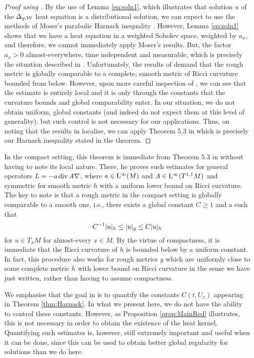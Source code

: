 \documentclass[a4paper, 12pt]{amsart}
\begin{document}
\begin{proof}[Proof using \cite{SC}]
By the use of Lemma \ref{eq:soln1}, which illustrates that solution $u$ of the $\Delta_{g,\mathcal{W}}$ heat equation is a distributional solution, we can expect to use the methods of Moser's parabolic Harnack inequality \cite{MR0159139,MR0288405}. However, Lemma \ref{eq:soln1} shows that we have a heat equation in a weighted Sobolev space, weighted by $a_x$, and therefore, we cannot immediately apply Moser's results. But, the factor $a_x > 0$ almost-everywhere, time independent and measurable, which is precisely the situation described in \cite[Section 4]{SC}.  Unfortunately, the results of \cite{SC} demand that the rough metric is globally comparable to a complete, smooth metric of Ricci curvature bounded from below. However, upon more careful inspection of \cite{SC}, we can see that the estimate is entirely local and it is only through the constants that the curvature bounds and global comparability enter. In our situation, we do not obtain uniform, global constants (and indeed do not expect them at this level of generality), but such control is not necessary for our applications. Thus, on noting that the results in \cite{SC} localise, we can apply Theorem 5.3 in \cite{SC} which is precisely our Harnack inequality stated in the theorem.
\end{proof}

In the compact setting, this theorem 
is immediate from Theorem 5.3 in \cite{SC} without having to note
its local nature. There, 
he proves such estimates for general operators
$L = -a \operatorname{div} A \nabla$, where $a \in {\rm L}^{\infty}_{\rm {}}(M)$
and $A \in {\rm L}^{\infty}_{\rm {}}(T^{1,1}M)$ and symmetric
for smooth metric $h$ with a uniform lower bound
on Ricci curvature.
The key to note is that a rough metric in the 
compact setting is globally comparable to a smooth one, 
i.e., there exists a global constant $C \geq 1$ 
and a 
such that
$$ C^{-1} |u|_{h} \leq |u|_g \leq C |u|_{h}$$
for $u \in T_x M$ for almost-every $x \in M$.
By the virtue of compactness, it is immediate
that the Ricci curvature of $h$ is bounded below
by a uniform constant. 
In fact, this procedure also works 
for rough metrics $g$ which 
are uniformly close to some complete metric $h$ with 
lower bound on Ricci curvature in the sense
we have just written, rather than having to assume compactness.

We emphasise that the goal in \cite{SC}
is to quantify the constants $C(t,U_x)$
appearing in Theorem \ref{thm:Harnack}. In what we present here, we do not have
the ability to control these constants. However, as
Proposition \ref{prop:MainRed} illustrates, this is not necessary 
in order to obtain the existence of the heat kernel.
Quantifying such estimates is, however, still 
extremely important and useful when it can be done, 
since this can be used to obtain better global regularity for
solutions than we do here.
\end{document}
